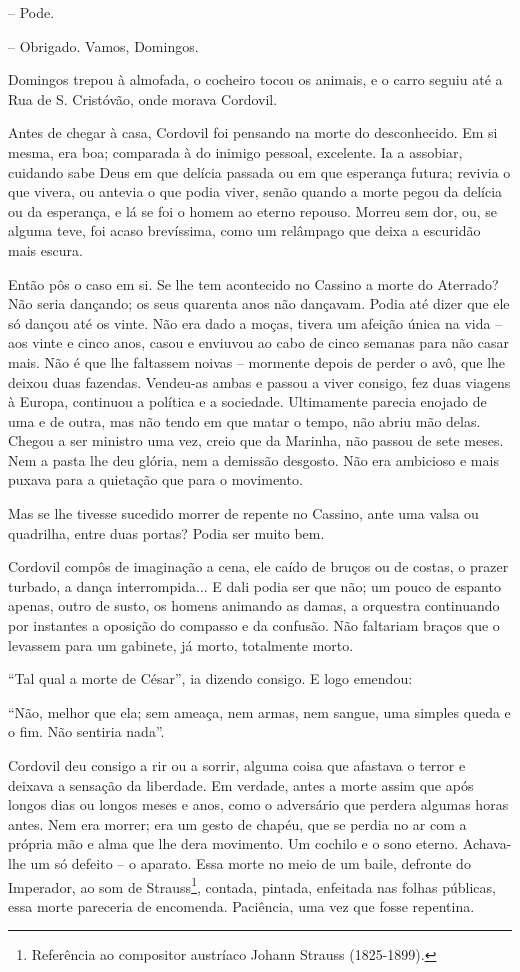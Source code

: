-- Pode.

-- Obrigado. Vamos, Domingos.

Domingos trepou à almofada, o cocheiro tocou os animais, e o carro
seguiu até a Rua de S. Cristóvão, onde morava Cordovil.

Antes de chegar à casa, Cordovil foi pensando na morte do desconhecido.
Em si mesma, era boa; comparada à do inimigo pessoal, excelente. Ia a
assobiar, cuidando sabe Deus em que delícia passada ou em que esperança
futura; revivia o que vivera, ou antevia o que podia viver, senão quando
a morte pegou da delícia ou da esperança, e lá se foi o homem ao eterno
repouso. Morreu sem dor, ou, se alguma teve, foi acaso brevíssima, como
um relâmpago que deixa a escuridão mais escura.

Então pôs o caso em si. Se lhe tem acontecido no Cassino a morte do
Aterrado? Não seria dançando; os seus quarenta anos não dançavam. Podia
até dizer que ele só dançou até os vinte. Não era dado a moças, tivera
um afeição única na vida -- aos vinte e cinco anos, casou e enviuvou ao
cabo de cinco semanas para não casar mais. Não é que lhe faltassem
noivas -- mormente depois de perder o avô, que lhe deixou duas fazendas.
Vendeu-as ambas e passou a viver consigo, fez duas viagens à Europa,
continuou a política e a sociedade. Ultimamente parecia enojado de uma e
de outra, mas não tendo em que matar o tempo, não abriu mão delas.
Chegou a ser ministro uma vez, creio que da Marinha, não passou de sete
meses. Nem a pasta lhe deu glória, nem a demissão desgosto. Não era
ambicioso e mais puxava para a quietação que para o movimento.

Mas se lhe tivesse sucedido morrer de repente no Cassino, ante uma valsa
ou quadrilha, entre duas portas? Podia ser muito bem.

Cordovil compôs de imaginação a cena, ele caído de bruços ou de costas,
o prazer turbado, a dança interrompida... E dali podia ser que não; um
pouco de espanto apenas, outro de susto, os homens animando as damas, a
orquestra continuando por instantes a oposição do compasso e da
confusão. Não faltariam braços que o levassem para um gabinete, já
morto, totalmente morto.

``Tal qual a morte de César'', ia dizendo consigo. E logo emendou:

``Não, melhor que ela; sem ameaça, nem armas, nem sangue, uma simples
queda e o fim. Não sentiria nada''.

Cordovil deu consigo a rir ou a sorrir, alguma coisa que afastava o
terror e deixava a sensação da liberdade. Em verdade, antes a morte
assim que após longos dias ou longos meses e anos, como o adversário que
perdera algumas horas antes. Nem era morrer; era um gesto de chapéu, que
se perdia no ar com a própria mão e alma que lhe dera movimento. Um
cochilo e o sono eterno. Achava-lhe um só defeito -- o aparato. Essa
morte no meio de um baile, defronte do Imperador, ao som de
Strauss\footnote{Referência ao compositor austríaco Johann Strauss
  (1825-1899).}, contada, pintada, enfeitada nas folhas públicas, essa
morte pareceria de encomenda. Paciência, uma vez que fosse repentina.

